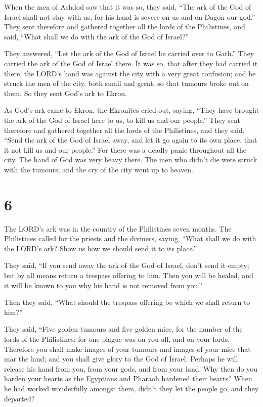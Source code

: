  When the men of Ashdod saw that it was so, they said, ``The
ark of the God of Israel shall not stay with us, for his hand is severe
on us and on Dagon our god.''  They sent therefore and
gathered together all the lords of the Philistines, and said, ``What
shall we do with the ark of the God of Israel?''

They answered, ``Let the ark of the God of Israel be carried over to
Gath.'' They carried the ark of the God of Israel there.  It
was so, that after they had carried it there, the LORD's hand was
against the city with a very great confusion; and he struck the men of
the city, both small and great, so that tumours broke out on them.
 So they sent God's ark to Ekron.

As God's ark came to Ekron, the Ekronites cried out, saying, ``They have
brought the ark of the God of Israel here to us, to kill us and our
people.''  They sent therefore and gathered together all
the lords of the Philistines, and they said, ``Send the ark of the God
of Israel away, and let it go again to its own place, that it not kill
us and our people.'' For there was a deadly panic throughout all the
city. The hand of God was very heavy there.  The men who
didn't die were struck with the tumours; and the cry of the city went up
to heaven.

\hypertarget{section-5}{%
\section{6}\label{section-5}}

 The LORD's ark was in the country of the Philistines seven
months.  The Philistines called for the priests and the
diviners, saying, ``What shall we do with the LORD's ark? Show us how we
should send it to its place.''

 They said, ``If you send away the ark of the God of Israel,
don't send it empty; but by all means return a trespass offering to him.
Then you will be healed, and it will be known to you why his hand is not
removed from you.''

 Then they said, ``What should the trespass offering be
which we shall return to him?''

They said, ``Five golden tumours and five golden mice, for the number of
the lords of the Philistines; for one plague was on you all, and on your
lords.  Therefore you shall make images of your tumours and
images of your mice that mar the land; and you shall give glory to the
God of Israel. Perhaps he will release his hand from you, from your
gods, and from your land.  Why then do you harden your
hearts as the Egyptians and Pharaoh hardened their hearts? When he had
worked wonderfully amongst them, didn't they let the people go, and they
departed?

